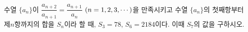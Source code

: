 \hspace*{2mm}\begin{minipage}[t]{\dimexpr\linewidth-2mm\relax}\vspace{0pt}
수열 $\{a_n\}$이 $\dfrac{a_{n+2}}{a_{n+1}}=\dfrac{a_{n+1}}{a_n}$ $(n=1{,}\mkern3mu\mathopen{}2{,}\mkern3mu\mathopen{}3{,}\mkern3mu\mathopen{}\cdots)$을 만족시키고 수열 $\{a_n\}$의 첫째항부터 제$n$항까지의 합을 $S_n$이라 할 때, $S_3=78$, $S_6=2184$이다. 이때 $S_7$의 값을 구하시오.\end{minipage}
